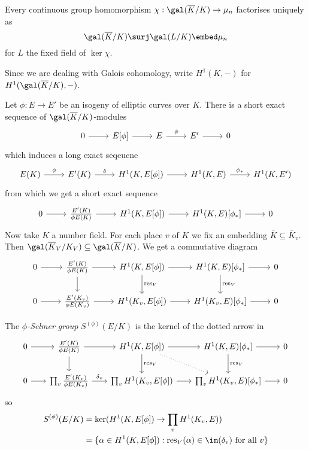 \documentclass[a4paper]{article}
\theoremstyle{definition}
\theoremstyle{theorem}
\begin{document}
\begin{remark}
  Every continuous group homomorphism \(\chi: \gal(\overline K/K) \to \mu_n\) factorises uniquely as
  \[
    \gal(\overline K/K) \surj \gal(L/K) \embed \mu_n
  \]
  for \(L\) the fixed field of \(\ker \chi\).
\end{remark}

\begin{notation}
  Since we are dealing with Galois cohomology, write \(H^1(K, -)\) for \(H^1(\gal(\overline K/K), -)\).
\end{notation}

Let \(\phi: E \to E'\) be an isogeny of elliptic curves over \(K\). There is a short exact sequence of \(\gal(\overline K/K)\)-modules
\[
  \begin{tikzcd}
    0 \ar[r] & E[\phi] \ar[r] & E \ar[r, "\phi"] & E' \ar[r] & 0
  \end{tikzcd}
\]
which induces a long exact seqeucne
\[
  \begin{tikzcd}
    E(K) \ar[r, "\phi"] & E'(K) \ar[r, "\delta"] & H^1(K, E[\phi]) \ar[r] & H^1(K, E) \ar[r, "\phi_*"] & H^1(K, E')
  \end{tikzcd}
\]
from which we get a short exact sequence
\[
  \begin{tikzcd}
    0 \ar[r] & \frac{E'(K)}{\phi E(K)} \ar[r] & H^1(K, E[\phi]) \ar[r] & H^1(K, E)[\phi_*] \ar[r] & 0
  \end{tikzcd}
\]
Now take \(K\) a number field. For each place \(v\) of \(K\) we fix an embedding \(\overline K \subseteq \overline K_v\). Then \(\gal(\overline K_V/K_V) \subseteq \gal(\overline K/K)\). We get a commutative diagram
\[
  \begin{tikzcd}
    0 \ar[r] & \frac{E'(K)}{\phi E(K)} \ar[r] \ar[d] & H^1(K, E[\phi]) \ar[r] \ar[d, "\mathrm{res}_V"] & H^1(K, E)[\phi_*] \ar[r] \ar[d, "\mathrm{res}_V"] & 0 \\
    0 \ar[r] & \frac{E'(K_v)}{\phi E(K_v)} \ar[r] & H^1(K_v, E[\phi]) \ar[r] & H^1(K_v, E)[\phi_*] \ar[r] & 0
  \end{tikzcd}
\]

\begin{definition}
  The \emph{\(\phi\)-Selmer group} \(S^{(\phi)}(E/K)\) is the kernel of the dotted arrow in
  \[
    \begin{tikzcd}[column sep=scriptsize]
      0 \ar[r] & \frac{E'(K)}{\phi E(K)} \ar[r] \ar[d] & H^1(K, E[\phi]) \ar[r] \ar[d, "\mathrm{res}_V"] \ar[dr, dotted] & H^1(K, E)[\phi_*] \ar[r] \ar[d, "\mathrm{res}_V"] & 0 \\
      0 \ar[r] & \prod_v \frac{E'(K_v)}{\phi E(K_v)} \ar[r, "\delta_v"] & \prod_v H^1(K_v, E[\phi]) \ar[r] & \prod_v H^1(K_v, E)[\phi_*] \ar[r] & 0
    \end{tikzcd}
  \]
  so
  \begin{align*}
    S^{(\phi)}(E/K)
    &= \ker(H^1(K, E[\phi]) \to \prod_v H^1(K_v, E)) \\
    &= \{\alpha\in H^1(K, E[\phi]): \mathrm{res}_V(\alpha) \in \im (\delta_v) \text{ for all } v\}
  \end{align*}
\end{definition}
\end{document}
